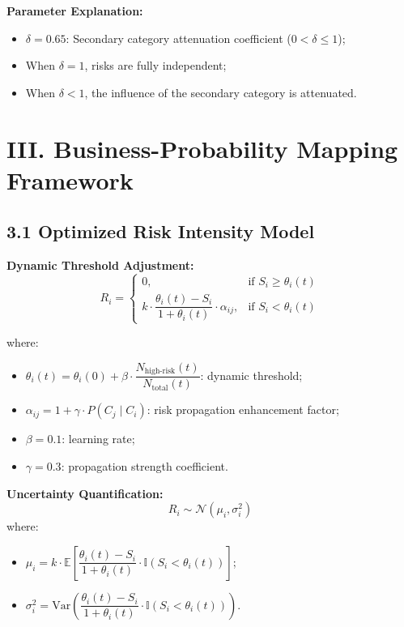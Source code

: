 \documentclass{article}
\numberwithin{equation}{section}
\begin{document}
\textbf{Parameter Explanation:}
\begin{itemize}
    \item $ \delta = 0.65 $: Secondary category attenuation coefficient ($ 0 < \delta \leq 1 $);
    \item When $ \delta = 1 $, risks are fully independent;
    \item When $ \delta < 1 $, the influence of the secondary category is attenuated.
\end{itemize}






\section*{III. Business-Probability Mapping Framework}

\subsection*{3.1 Optimized Risk Intensity Model}

\textbf{Dynamic Threshold Adjustment:}
$$
R_i = 
\begin{cases} 
0, & \text{if } S_i \geq \theta_i(t) \\
k \cdot \dfrac{\theta_i(t) - S_i}{1 + \theta_i(t)} \cdot \alpha_{ij}, & \text{if } S_i < \theta_i(t)
\end{cases}
$$

where:
\begin{itemize}
    \item $ \theta_i(t) = \theta_i(0) + \beta \cdot \dfrac{N_{\text{high-risk}}(t)}{N_{\text{total}}(t)} $: dynamic threshold;
    \item $ \alpha_{ij} = 1 + \gamma \cdot P(C_j \mid C_i) $: risk propagation enhancement factor;
    \item $ \beta = 0.1 $: learning rate;
    \item $ \gamma = 0.3 $: propagation strength coefficient.
\end{itemize}

\textbf{Uncertainty Quantification:}
$$
R_i \sim \mathcal{N}\left(\mu_i, \sigma_i^2\right)
$$
where:
\begin{itemize}
    \item $ \mu_i = k \cdot \mathbb{E}\left[\dfrac{\theta_i(t) - S_i}{1 + \theta_i(t)} \cdot \mathbb{I}(S_i < \theta_i(t))\right] $;
    \item $ \sigma_i^2 = \text{Var}\left(\dfrac{\theta_i(t) - S_i}{1 + \theta_i(t)} \cdot \mathbb{I}(S_i < \theta_i(t))\right) $.
\end{itemize}
\end{document}

